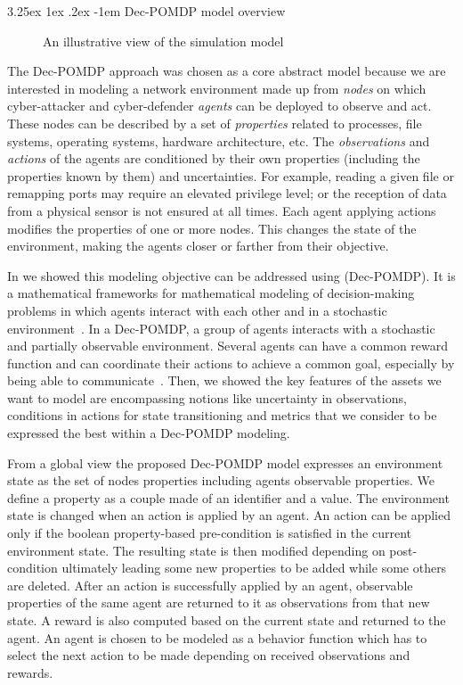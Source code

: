 \documentclass[conference]{IEEEtran}
\makeatletter
\renewcommand\subparagraph{\@startsection{subparagraph}{6}{\parindent}%
  {3.25ex \@plus1ex \@minus .2ex}%
  {-1em}%
  {\normalfont\normalsize\bfseries}}
\makeatother
\begin{document}
\subparagraph{Dec-POMDP model overview}

\begin{figure*}[]
    \centering
    
    \caption{An illustrative view of the simulation model}
    \label{fig:model_example_illustration}
\end{figure*}

The Dec-POMDP approach was chosen as a core abstract model because we are interested in modeling a network environment made up from \textit{nodes} on which cyber-attacker and cyber-defender \textit{agents} can be deployed to observe and act. These nodes can be described by a set of \textit{properties} related to processes, file systems, operating systems, hardware architecture, etc.
The \textit{observations} and \textit{actions} of the agents are conditioned by their own properties (including the properties known by them) and uncertainties. For example, reading a given file or remapping ports may require an elevated privilege level; or the reception of data from a physical sensor is not ensured at all times.
Each agent applying actions modifies the properties of one or more nodes. This changes the state of the environment, making the agents closer or farther from their objective.

In \cite{soule2023} we showed this modeling objective can be addressed using  (Dec-POMDP). It is a mathematical frameworks for mathematical modeling of decision-making problems in which agents interact with each other and in a stochastic environment~\cite{beynier2010}. In a Dec-POMDP, a group of agents interacts with a stochastic and partially observable environment. Several agents can have a common reward function and can coordinate their actions to achieve a common goal, especially by being able to communicate~\cite{bernstein2013}.
Then, we showed the key features of the assets we want to model are encompassing notions like uncertainty in observations, conditions in actions for state transitioning and metrics that we consider to be expressed the best within a Dec-POMDP modeling.

From a global view the proposed Dec-POMDP model expresses an environment state as the set of nodes properties including agents observable properties. We define a property as a couple made of an identifier and a value. The environment state is changed when an action is applied by an agent. An action can be applied only if the boolean property-based pre-condition is satisfied in the current environment state. The resulting state is then modified depending on post-condition ultimately leading some new properties to be added while some others are deleted. After an action is successfully applied by an agent, observable properties of the same agent are returned to it as observations from that new state. A reward is also computed based on the current state and returned to the agent. An agent is chosen to be modeled as a behavior function which has to select the next action to be made depending on received observations and rewards.
\end{document}
